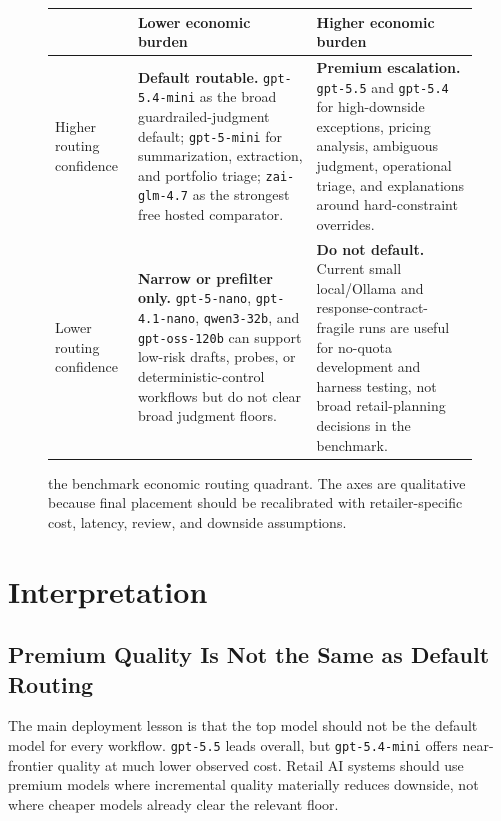 \documentclass[11pt]{article}
\newcommand{\code}[1]{\texttt{#1}}
\begin{document}
\begin{figure}[t]
\centering
\small
\begin{tabularx}{\textwidth}{>{\bfseries\raggedright\arraybackslash}p{} X X}
\toprule
 & Lower economic burden & Higher economic burden \\
\midrule
Higher routing confidence &
\cellcolor{mbteal!16}\textbf{Default routable.} \code{gpt-5.4-mini} as the broad guardrailed-judgment default; \code{gpt-5-mini} for summarization, extraction, and portfolio triage; \code{zai-glm-4.7} as the strongest free hosted comparator. &
\cellcolor{mbgold!22}\textbf{Premium escalation.} \code{gpt-5.5} and \code{gpt-5.4} for high-downside exceptions, pricing analysis, ambiguous judgment, operational triage, and explanations around hard-constraint overrides. \\
\addlinespace
Lower routing confidence &
\cellcolor{mbclay!13}\textbf{Narrow or prefilter only.} \code{gpt-5-nano}, \code{gpt-4.1-nano}, \code{qwen3-32b}, and \code{gpt-oss-120b} can support low-risk drafts, probes, or deterministic-control workflows but do not clear broad judgment floors. &
\cellcolor{mbpurple!14}\textbf{Do not default.} Current small local/Ollama and response-contract-fragile runs are useful for no-quota development and harness testing, not broad retail-planning decisions in the benchmark. \\
\bottomrule
\end{tabularx}
\caption{the benchmark economic routing quadrant. The axes are qualitative because final placement should be recalibrated with retailer-specific cost, latency, review, and downside assumptions.}
\label{fig:routingquadrant}
\end{figure}

\section{Interpretation}

\subsection{Premium Quality Is Not the Same as Default Routing}

The main deployment lesson is that the top model should not be the default model for every workflow. \code{gpt-5.5} leads overall, but \code{gpt-5.4-mini} offers near-frontier quality at much lower observed cost. Retail AI systems should use premium models where incremental quality materially reduces downside, not where cheaper models already clear the relevant floor.
\end{document}
